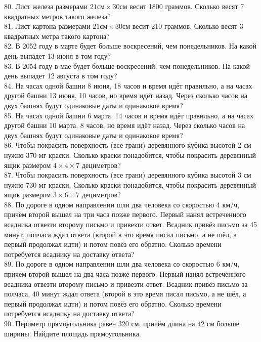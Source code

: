 80. Лист железа размерами $21\text{см}\times30\text{см}$ весит 1800 граммов. Сколько весят 7 квадратных метров такого железа?\\
81. Лист картона размерами $21\text{см}\times30\text{см}$ весит 210 граммов. Сколько весят 3 квадратных метра такого картона?\\
82. В 2052 году в марте будет больше воскресений, чем понедельников. На какой день выпадет 13 июня в том году?\\
83. В 2054 году в мае будет больше воскресений, чем понедельников. На какой день выпадет 12 августа в том году?\\
84. На часах одной башни 8 июня, 18 часов и время идёт правильно, а на часах другой башни 13 июня, 10 часов, но время идёт назад. Через сколько часов на двух башнях будут одинаковые даты и одинаковое время?\\
85. На часах одной башни 6 марта, 14 часов и время идёт правильно, а на часах другой башни 10 марта, 8 часов, но время идёт назад. Через сколько часов на двух башнях будут одинаковые даты и одинаковое время?\\
86. Чтобы покрасить поверхность (все грани) деревянного кубика высотой 2 см нужно 370 мг краски. Сколько краски понадобится, чтобы покрасить деревянный ящик размером $4\times4\times7$ дециметров?\\
87. Чтобы покрасить поверхность (все грани) деревянного кубика высотой 3 см нужно 730 мг краски. Сколько краски понадобится, чтобы покрасить деревянный ящик размером $3\times6\times7$ дециметров?\\
88. По дороге в одном направлении шли два человека со скоростью 4 км/ч, причём второй вышел на три часа позже первого. Первый нанял встреченного всадника отвезти второму письмо и привезти ответ. Всадник привёз письмо за 45 минут, полчаса ждал ответа (второй в это время писал письмо, а не шёл, а первый продолжал идти) и потом повёз его обратно. Сколько времени потребуется всаднику на доставку ответа?\\
89. По дороге в одном направлении шли два человека со скоростью 6 км/ч, причём второй вышел на два часа позже первого. Первый нанял встреченного всадника отвезти второму письмо и привезти ответ. Всадник привёз письмо за полчаса, 40 минут ждал ответа (второй в это время писал письмо, а не шёл, а первый продолжал идти) и потом повёз его обратно. Сколько времени потребуется всаднику на доставку ответа?\\
90. Периметр прямоугольника равен 320 см, причём длина на 42 см больше ширины. Найдите площадь прямоугольника.\\
